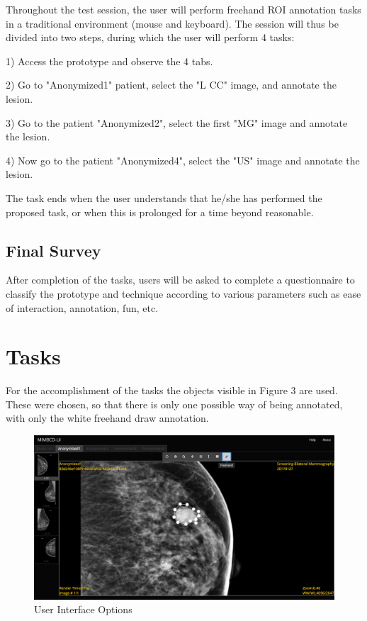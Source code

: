 \documentclass{article}
\begin{document}
Throughout the test session, the user will perform freehand ROI annotation tasks in a traditional environment (mouse and keyboard). The session will thus be divided into two steps, during which the user will perform 4 tasks:

1) Access the prototype and observe the 4 tabs.

2) Go to "Anonymized1" patient, select the "L CC" image, and annotate the lesion.

3) Go to the patient "Anonymized2", select the first "MG" image and annotate the lesion.

4) Now go to the patient "Anonymized4", select the "US" image and annotate the lesion.

The task ends when the user understands that he/she has performed the proposed task, or when this is prolonged for a time beyond reasonable.

\subsection{Final Survey}

After completion of the tasks, users will be asked to complete a questionnaire to classify the prototype and technique according to various parameters such as ease of interaction, annotation, fun, etc.

\section{Tasks}

For the accomplishment of the tasks the objects visible in Figure 3 are used. These were chosen, so that there is only one possible way of being annotated, with only the white freehand draw annotation.

\begin{figure}[h]
\caption{User Interface Options}
\centering
\includegraphics[width=\textwidth]{img2.png}
\end{figure}
\end{document}
